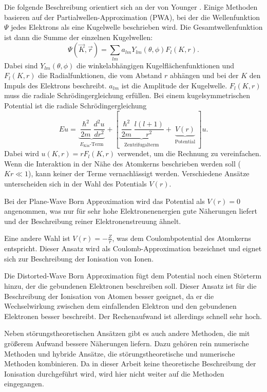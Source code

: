 Die folgende Beschreibung orientiert sich an der von Younger \cite{EII}. Einige Methoden basieren auf der Partialwellen-Approximation (PWA), bei der die Wellenfunktion $\Psi$ jedes Elektrons als eine Kugelwelle beschrieben wird. Die Gesamtwellenfunktion ist dann die Summe der einzelnen Kugelwellen:
\begin{equation}
    \Psi (\vec K, \vec r) = \sum_{lm}a_{lm}Y_{lm}(\theta, \phi) F_l(K,r).
\end{equation}
Dabei sind $Y_{lm}(\theta,\phi)$ die winkelabhängigen Kugelflächenfunktionen und $F_l(K,r)$ die Radialfunktionen, die vom Abstand $r$ abhängen und bei der $K$ den Impuls des Elektrons beschreibt. $a_{lm}$ ist die Amplitude der Kugelwelle. $F_l(K,r)$ muss die radiale Schrödingergleichung erfüllen. Bei einem kugelsymmetrischen Potential ist die radiale Schrödingergleichung
\begin{equation}
    E u = \underbrace{\frac{\hslash^2}{2m}\frac{d^2 u}{dr^2}}_{\substack{\text{$E_\mathrm{Kin}$-Term}}} + \left[\underbrace{\frac{\hslash^2}{2m} \frac{l(l+1)}{r^2}}_{\substack{\text{Zentrifugalterm}}} + \underbrace{V(r)}_{\substack{\text{Potential}}} \right] u.
\end{equation}
Dabei wird $u(K,r) = rF_l(K,r)$ verwendet, um die Rechnung zu vereinfachen.
Wenn die Interaktion in der Nähe des Atomkerns beschrieben werden soll ($Kr \ll 1$), kann keiner der Terme vernachlässigt werden. Verschiedene Ansätze unterscheiden sich in der Wahl des Potentials $V(r)$. 

Bei der Plane-Wave Born Approximation wird das Potential als $V(r) = 0$ angenommen, was nur für sehr hohe Elektronenenergien gute Näherungen liefert und der Beschreibung reiner Elektronenstreuung ähnelt.

Eine andere Wahl ist $V(r) = -\frac{Z}{r}$, was dem Coulombpotential des Atomkerns entspricht. Dieser Ansatz wird als Coulomb-Approximation bezeichnet und eignet sich zur Beschreibung der Ionisation von Ionen.

Die Distorted-Wave Born Approximation fügt dem Potential noch einen Störterm hinzu, der die gebundenen Elektronen beschreiben soll. Dieser Ansatz ist für die Beschreibung der Ionisation von Atomen besser geeignet, da er die Wechselwirkung zwischen dem einfallenden Elektron und den gebundenen Elektronen besser beschreibt. Der Rechenaufwand ist allerdings schnell sehr hoch.

Neben störungstheoretischen Ansätzen gibt es auch andere Methoden, die mit größerem Aufwand bessere Näherungen liefern. Dazu gehören rein numerische Methoden und hybride Ansätze, die störungstheoretische und numerische Methoden kombinieren. Da in dieser Arbeit keine theoretische Beschreibung der Ionisation durchgeführt wird, wird hier nicht weiter auf die Methoden eingegangen.

